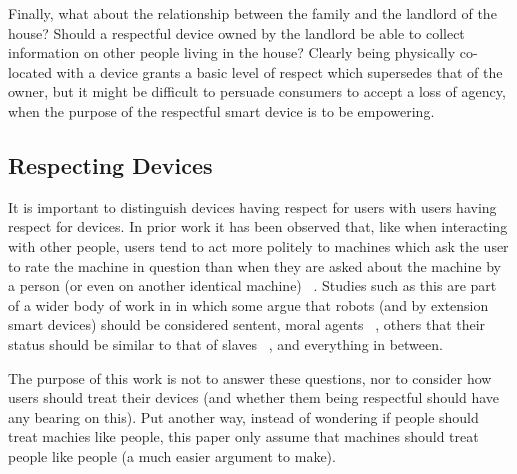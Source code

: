 \documentclass{IETpaper}
\begin{document}
Finally, what about the relationship between the family and the landlord of the house? Should a respectful device owned by the landlord be able to collect information on other people living in the house? Clearly being physically co-located with a device grants a basic level of respect which supersedes that of the owner, but it might be difficult to persuade consumers to accept a loss of agency, when the purpose of the respectful smart device is to be empowering.






\subsection{Respecting Devices}
It is important to distinguish devices having respect for users with users having respect for devices. In prior work it has been observed that, like when interacting with other people, users tend to act more politely to machines which ask the user to rate the machine in question than when they are asked about the machine by a person (or even on another identical machine) ~\cite{nass1999people}. Studies such as this are part of a wider body of work in in which some argue that robots (and by extension smart devices) should be considered sentent, moral agents ~\cite{bryson2010robots}, others that their status should be similar to that of slaves ~\cite{hern2017give}, and everything in between.

The purpose of this work is not to answer these questions, nor to consider how users should treat their devices (and whether them being respectful should have any bearing on this). Put another way, instead of wondering if people should treat machies like people, this paper only assume that machines should treat people like people (a much easier argument to make).



\end{document}
